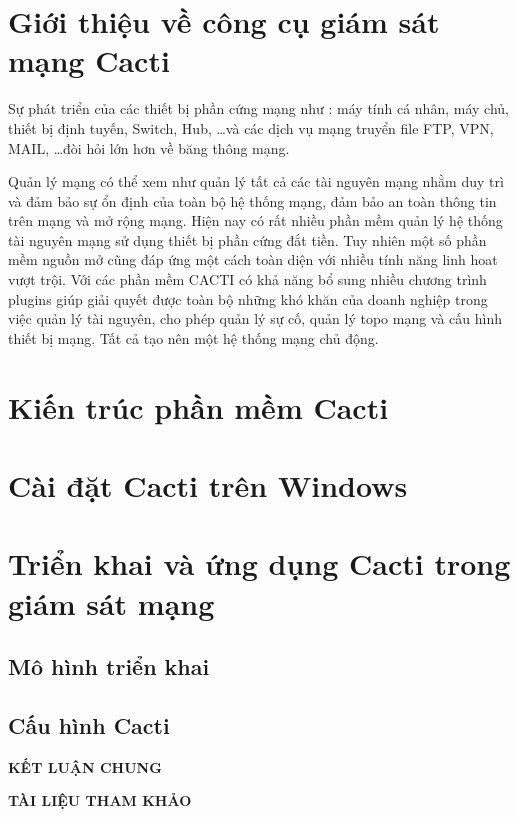 \documentclass[12pt,oneside,a4paper,reqno]{report}
\begin{document}
\begin{large}
\section{Giới thiệu về công cụ giám sát mạng Cacti}
Sự phát triển của các thiết bị phần cứng mạng như : máy tính cá nhân, máy chủ, thiết bị định tuyến, Switch, Hub, \ldots và các dịch vụ mạng truyển file FTP, VPN, MAIL, \ldots đòi hỏi lớn hơn về băng thông mạng.

Quản lý mạng có thể xem như quản lý tất cả các tài nguyên mạng nhằm duy trì và đảm bảo sự ổn định của toàn bộ hệ thống mạng, đảm bảo an toàn thông tin trên mạng và mở rộng mạng. Hiện nay có rất nhiều phần mềm quản lý hệ thống tài nguyên mạng sử dụng thiết bị phần cứng đắt tiền. Tuy nhiên một số phần mềm nguồn mở cũng đáp ứng một cách toàn diện với nhiều tính năng linh hoat vượt trội. Với các phần mềm CACTI có khả năng bổ sung nhiều chương trình plugins giúp giải quyết được toàn bộ những khó khăn của doanh nghiệp trong việc quản lý tài nguyên, cho phép quản lý sự cố, quản lý topo mạng và cấu hình thiết bị mạng. Tất cả tạo nên một hệ thống mạng chủ động. 
\section{Kiến trúc phần mềm Cacti}
\section{Cài đặt Cacti trên Windows}
\section{Triển khai và ứng dụng Cacti trong giám sát mạng}
\subsection{Mô hình triển khai}
\subsection{Cấu hình Cacti}

\newpage
\vspace*{0.2cm}
\centerline{\Large\bf KẾT LUẬN CHUNG}
\vspace*{0.5cm}

\newpage
\vspace*{0.2cm}
\centerline{\Large\bf TÀI LIỆU THAM KHẢO}
\vspace*{0.5cm}


\end{large}
\end{document}
